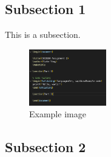 \documentclass[12pt,a4paper]{report}
\begin{document}
\subsection{Subsection 1}
This is a subsection.

\begin{figure}[h]
    \centering
    \includegraphics[width=0.3\textwidth]{src/example.png}
    \caption{Example image}
\end{figure}

\subsection{Subsection 2}
\end{document}
